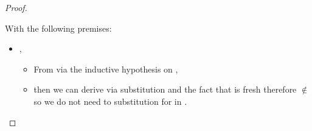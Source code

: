 \begin{lemma}
\begin{proof}
\begin{case}[B-BetaMulti]
\begin{itemize}
\begin{subcase}[T-App]
  With the following premises:
\begin{itemize}
  \item
{\judgementrewrite{{\propenv{}},{\thenprop{\propp{}}}}
                  {}
                  { {}{\x{}}}
                  {\replacefor
                   {
                               {}}
                             {}
                             {\x{}}}
                  {\replacefor
                          {}
                             {}
                             {\x{}}}
                  {}
                        },
    \begin{itemize}
      \item From
{\judgementrewrite{{\propenv{}},{\isprop{\s{}}{\x{}}}}
                  {}
                  {}
               {
                                       {}}
                          {}
                          {}}
          via the inductive hypothesis on 
  \opsem {\openv{}}
         { {}}
         {\val{}},
      \item then we can derive
{\judgementrewrite{{\propenv{}}}
                  {}
                  { {}{\x{}}}
                  {\replacefor
                   {
                               {}}
                             {}
                             {\x{}}}
                  {\replacefor
                          {}
                             {}
                             {\x{}}}
                  {}
                        } via substitution and the fact that {\x{}} is fresh 
                        therefore \x{} $\not\in$ \fv{\propenv{}} so we do not need to substitution for \x{} in \propenv{}. %
                        

\end{itemize}
\end{itemize}
\end{subcase}
\end{itemize}
\end{case}
\end{proof}
\end{lemma}
